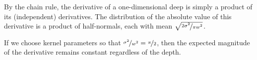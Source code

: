\documentclass[twoside]{article}
\makeatletter
\newlength{\nonHumbleHeight}
\def\@humbleformat#1{{\settoheight{\nonHumbleHeight}{#1}\resizebox{!}{0.94\nonHumbleHeight}{#1}}}%
\newcommand\humble[1]{{\@humbleformat{#1}}}%
\newcommand{\gp}{{\humble{GP}}}
\newcommand{\lengthscale}{w}
\makeatother
\begin{document}
 By the chain rule, the derivative of a one-dimensional deep \gp{} is simply a product of its (independent) derivatives.  
 The distribution of the absolute value of this derivative is a product of half-normals, each with mean $\sqrt{\nicefrac{2 \sigma^2}{\pi \lengthscale^2}}$.
%

If we choose kernel parameters so that ${\nicefrac{\sigma^2}{\lengthscale^2} = \nicefrac{\pi}{2}}$, then the expected magnitude of the derivative remains constant regardless of the depth.

\end{document}
